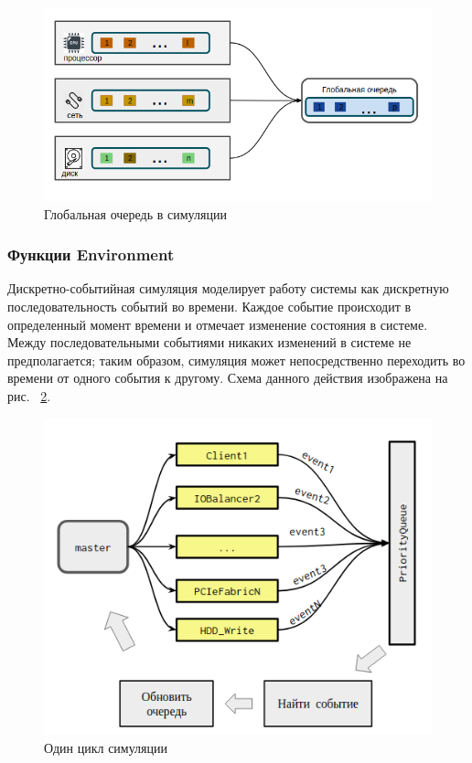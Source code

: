 \begin{figure}[t!]
	\centering
	\includegraphics[width=\textwidth]{Kenenbek/global_queue.png}
	\caption{Глобальная очередь в симуляции}
	\label{fig:globalqueue}
\end{figure}

\subsubsection{Функции Environment}
\par 
Дискретно-событийная симуляция моделирует работу системы как дискретную последовательность событий во времени. Каждое событие происходит в определенный момент времени и отмечает изменение состояния в системе. Между последовательными событиями никаких изменений в системе не предполагается; таким образом, симуляция может непосредственно переходить во времени от одного события к другому. Схема данного действия изображена на рис. ~\ref{fig:loop}.

\begin{figure}[!ht]
	\centering
	\includegraphics[width=\textwidth]{Kenenbek/images/loop.png}
	\caption{Один цикл симуляции}
	\label{fig:loop}
\end{figure}  

